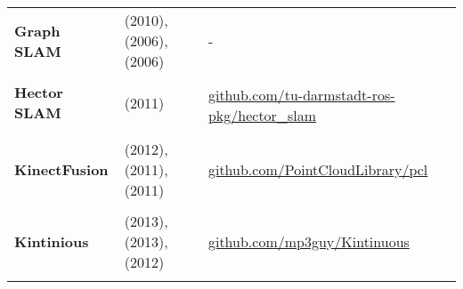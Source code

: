 \documentclass[a4paper,12pt]{scrartcl}
\begin{document}
{\begin{longtable}{l|l|l}
    \textbf{Graph SLAM}    & \cite{Grisetti2010} (2010), \cite{Olson2006} (2006), \cite{Thrun2006} (2006)                & -                                                                                                                            \\
                           &                                                                                             &                                                                                                                              \\ [-3mm]
    \textbf{Hector SLAM}   & \cite{Kohlbrecher2011} (2011)                                                               & \multirow{2}{15em}{\href{https://github.com/tu-darmstadt-ros-pkg/hector_slam}{github.com/tu-darmstadt-ros-pkg/hector\_slam}} \\
                           &                                                                                             &                                                                                                                              \\
                           &                                                                                             &                                                                                                                              \\ [-3mm]
    \textbf{KinectFusion}  & \cite{Pirovano2012} (2012), \cite{Izadi2011} (2011), \cite{Newcombe2011a} (2011)            & {\href{https://github.com/PointCloudLibrary/pcl}{github.com/PointCloudLibrary/pcl}}                                          \\
                           &                                                                                             &                                                                                                                              \\ [-3mm]
    \textbf{Kintinious}    & \cite{Whelan2013a} (2013), \cite{Whelan2013} (2013), \cite{Whelan2012} (2012)               & {\href{https://github.com/mp3guy/Kintinuous}{github.com/mp3guy/Kintinuous}}                                                  \\
                           &                                                                                             &                                                                                                                              \\ [-3mm]

\end{longtable}}
\end{document}
